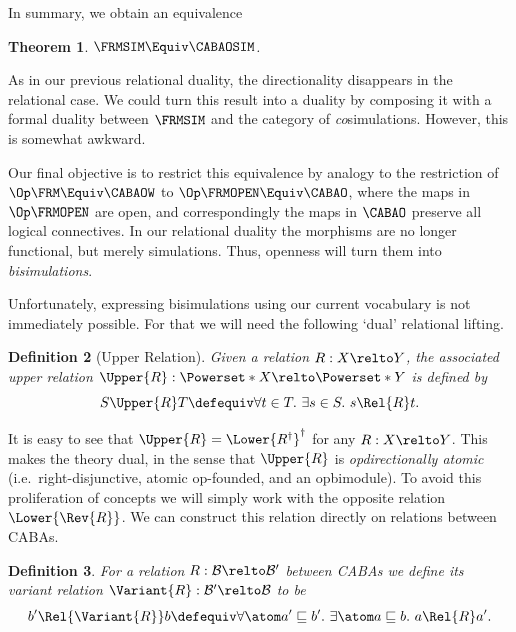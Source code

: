 \documentclass[10pt,a4paper]{article}
\newtheorem{theorem}{Theorem}
\newtheorem{definition}[theorem]{Definition}
\begin{document}
In summary, we obtain an equivalence

\begin{theorem}
  \label{theorem:rel-thomason}
  $
  \FRMSIM \Equiv \CABAOSIM
  $.
\end{theorem}

As in our previous relational duality, the directionality disappears in the
relational case. We could turn this result into a duality by composing it with a formal
duality between $\FRMSIM$ and the category of \emph{co}simulations. However,
this is somewhat awkward.

Our final objective is to restrict this equivalence by analogy to the
restriction of \(\Op\FRM \Equiv \CABAOW\) to \(\Op\FRMOPEN \Equiv \CABAO\),
where the maps in \(\Op\FRMOPEN\) are open, and correspondingly the maps in
\(\CABAO\) preserve all logical connectives. In our relational duality the
morphisms are no longer functional, but merely simulations. Thus, openness will
turn them into \emph{bisimulations}.

Unfortunately, expressing bisimulations using our current vocabulary is not
immediately possible. For that we will need the following `dual' relational
lifting.

\begin{definition}[Upper Relation]
  Given a relation \(R : X \relto Y\), the associated upper relation \(\Upper{R}
  : \Powerset*{X} \relto \Powerset*{Y}\) is defined by
  \[
    S \Upper{R} T \defequiv \forall t \in T.\ \exists s \in S.\ s \Rel{R} t.
  \]
\end{definition}
It is easy to see that $\Upper{R} = \Lower{R^\dagger}^\dagger$ for any $R : X \relto Y$.
This makes the theory dual, in the sense that $\Upper{R}$ is
\emph{opdirectionally atomic} (i.e.\ right-disjunctive, atomic op-founded, and an
opbimodule). To avoid this proliferation of concepts we will simply work with
the opposite relation $\Lower{\Rev{R}}$. We can construct this relation directly
on relations between CABAs. 

\begin{definition}
  For a relation \(R : \mathcal{B} \relto \mathcal{B}'\) between CABAs we define
  its \emph{variant relation} \(\Variant{R} : \mathcal{B}' \relto \mathcal{B}\)
  to be
  \[
    b' \Rel{\Variant{R}} b
    \defequiv
      \forall \atom a' \sqsubseteq b'.\
      \exists \atom a \sqsubseteq b.\
      a \Rel{R} a'.
  \]
\end{definition}
\end{document}
